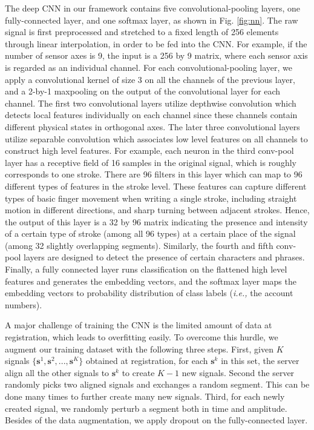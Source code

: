 \documentclass[conference]{IEEEtran}
\begin{document}
The deep CNN in our framework contains five convolutional-pooling layers, one fully-connected layer, and one softmax layer, as shown in Fig. \ref{fig:nn}. The raw signal is first preprocessed and stretched to a fixed length of 256 elements through linear interpolation, in order to be fed into the CNN. For example, if the number of sensor axes is 9, the input is a 256 by 9 matrix, where each sensor axis is regarded as an individual channel. For each convolutional-pooling layer, we apply a convolutional kernel of size 3 on all the channels of the previous layer, and a 2-by-1 maxpooling on the output of the convolutional layer for each channel. The first two convolutional layers utilize depthwise convolution \cite{chollet2016xception} which detects local features individually on each channel since these channels contain different physical states in orthogonal axes. The later three convolutional layers utilize separable convolution \cite{chollet2016xception} which associates low level features on all channels to construct high level features. For example, each neuron in the third conv-pool layer has a receptive field of 16 samples in the original signal, which is roughly corresponds to one stroke. There are 96 filters in this layer which can map to 96 different types of features in the stroke level. These features can capture different types of basic finger movement when writing a single stroke, including straight motion in different directions, and sharp turning between adjacent strokes. Hence, the output of this layer is a 32 by 96 matrix indicating the presence and intensity of a certain type of stroke (among all 96 types) at a certain place of the signal (among 32 slightly overlapping segments). Similarly, the fourth and fifth conv-pool layers are designed to detect the presence of certain characters and phrases. Finally, a fully connected layer runs classification on the flattened high level features and generates the embedding vectors, and the softmax layer maps the embedding vectors to probability distribution of class labels (\textit{i.e.,} the account numbers).

A major challenge of training the CNN is the limited amount of data at registration, which leads to overfitting easily. To overcome this hurdle, we augment our training dataset with the following three steps. First, given $K$ signals $\{\mathbf{s}^1, \mathbf{s}^2, ..., \mathbf{s}^K\}$ obtained at registration, for each $\mathbf{s}^k$ in this set, the server align all the other signals to $\mathbf{s}^k$ to create $K - 1$ new signals. Second the server randomly picks two aligned signals and exchanges a random segment. This can be done many times to further create many new signals. Third, for each newly created signal, we randomly perturb a segment both in time and amplitude. Besides of the data augmentation, we apply dropout \cite{srivastava2014dropout} on the fully-connected layer.
\end{document}
